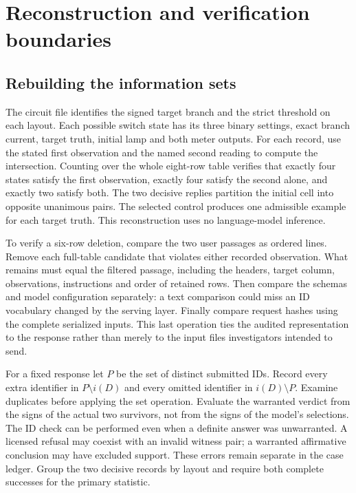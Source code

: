 \documentclass[12pt,letterpaper]{article}
\begin{document}
\section{Reconstruction and verification boundaries}

\subsection{Rebuilding the information sets}

The circuit file identifies the signed target branch and the strict threshold on each layout. Each possible switch state has its three binary settings, exact branch current, target truth, initial lamp and both meter outputs. For each record, use the stated first observation and the named second reading to compute the intersection. Counting over the whole eight-row table verifies that exactly four states satisfy the first observation, exactly four satisfy the second alone, and exactly two satisfy both. The two decisive replies partition the initial cell into opposite unanimous pairs. The selected control produces one admissible example for each target truth. This reconstruction uses no language-model inference.

To verify a six-row deletion, compare the two user passages as ordered lines. Remove each full-table candidate that violates either recorded observation. What remains must equal the filtered passage, including the headers, target column, observations, instructions and order of retained rows. Then compare the schemas and model configuration separately: a text comparison could miss an ID vocabulary changed by the serving layer. Finally compare request hashes using the complete serialized inputs. This last operation ties the audited representation to the response rather than merely to the input files investigators intended to send.

For a fixed response let $P$ be the set of distinct submitted IDs. Record every extra identifier in $P\setminus i(D)$ and every omitted identifier in $i(D)\setminus P$. Examine duplicates before applying the set operation. Evaluate the warranted verdict from the signs of the actual two survivors, not from the signs of the model's selections. The ID check can be performed even when a definite answer was unwarranted. A licensed refusal may coexist with an invalid witness pair; a warranted affirmative conclusion may have excluded support. These errors remain separate in the case ledger. Group the two decisive records by layout and require both complete successes for the primary statistic.
\end{document}
